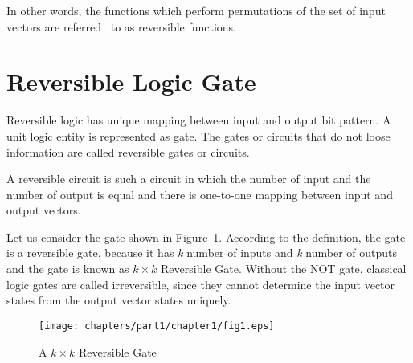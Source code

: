 In other words, the functions which perform permutations of the set of input vectors are referred~ to as reversible functions.

\section{Reversible Logic Gate}
Reversible logic has unique mapping between input and output bit pattern. A unit logic entity is represented as gate. The gates or circuits that do not loose information are called reversible gates or circuits.

\begin{property}\textnormal{
A reversible circuit is such a circuit in which the number of input and the number of output is equal and there is one-to-one mapping between input and output vectors.}
\end{property}

Let us consider the gate shown in Figure~\ref{fig:p1_c1_fig1}. According to the definition, the gate is a reversible gate, because it has \textit{k} number of inputs and \textit{k} number of outputs and the gate is known as $k \times k$ Reversible Gate. Without the NOT gate, classical logic gates are called irreversible, since they cannot determine the input vector states from the output vector states uniquely.
\begin{figure}[H]
\centering
\texttt{[image: chapters/part1/chapter1/fig1.eps]}
\caption{A $k \times k$ Reversible Gate}
\label{fig:p1_c1_fig1}
\end{figure}






